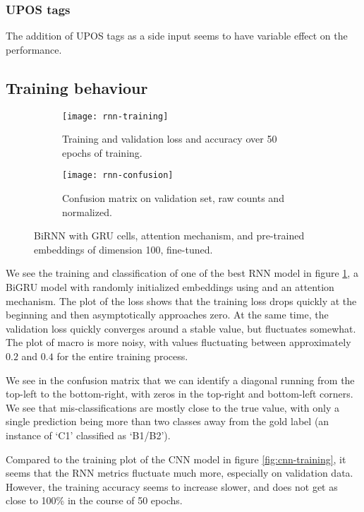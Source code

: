 \subsubsection*{UPOS tags}

The addition of UPOS tags as a side input seems to have variable effect on
the performance. 


\subsection{Training behaviour}

\begin{figure}
  \begin{subfigure}{\linewidth}
    \centering
    \texttt{[image: rnn-training]}
    \caption{Training and validation loss and accuracy over 50 epochs of training.}
  \end{subfigure}
  \begin{subfigure}{\linewidth}
    \centering
    \texttt{[image: rnn-confusion]}
    \caption{Confusion matrix on validation set, raw counts and normalized.}
  \end{subfigure}
  \caption[Training behaviour of BiGRU with attention]{
    BiRNN with GRU cells, attention mechanism, and pre-trained
    embeddings of dimension 100, fine-tuned.
  }
  \label{fig:rnn-training}
\end{figure}

We see the training and classification of one of the best RNN model in figure
\ref{fig:rnn-training}, a BiGRU model with randomly initialized embeddings
using and an attention mechanism. The plot of the loss shows that the
training loss drops quickly at the beginning and then asymptotically
approaches zero. At the same time, the validation loss quickly converges
around a stable value, but fluctuates somewhat. The plot of macro \FI is more
noisy, with values fluctuating between approximately $0.2$ and $0.4$ for the
entire training process.

We see in the confusion matrix that we can identify a diagonal running from
the top-left to the bottom-right, with zeros in the top-right and bottom-left
corners. We see that mis-classifications are mostly close to the true value,
with only a single prediction being more than two classes away from the gold
label (an instance of `C1' classified as `B1/B2').

Compared to the training plot of the CNN model in figure
\ref{fig:cnn-training}, it seems that the RNN metrics fluctuate much more,
especially on validation data. However, the training accuracy seems to
increase slower, and does not get as close to 100\% in the course of 50 epochs.

